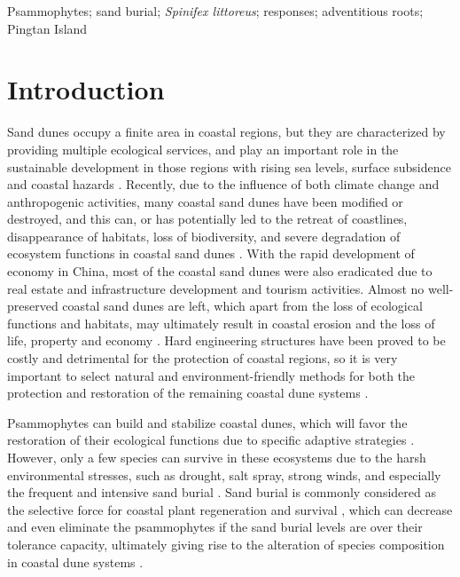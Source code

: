 \documentclass[]{interact}
\theoremstyle{plain}%
\theoremstyle{definition}
\theoremstyle{remark}
\begin{document}
\begin{keywords}
Psammophytes; sand burial; \textit{\textit{Spinifex littoreus}}; responses; adventitious roots; Pingtan Island
\end{keywords}


\section{Introduction}

\label{Introduction-1}
Sand dunes occupy a finite area in coastal regions, but they are characterized by providing multiple ecological services, and play an important role in the sustainable development in those regions with rising sea levels, surface subsidence and coastal hazards 
\citep{martinezFragilityConservationWorld2004,debattistiBelowgroundBiomassPlants2020}. 
Recently, due to the influence of both climate change and anthropogenic activities, many coastal sand dunes have been modified or destroyed, and this can, or has potentially led to the retreat of coastlines, disappearance of habitats, loss of biodiversity, and severe degradation of ecosystem functions in coastal sand dunes 
\citep{feaginCoastalErosionGlobal2005,schlacherVegetationGhostCrabs2011,quEffectsSandBurial2017}. 
With the rapid development of economy in China, most of the coastal sand dunes were also eradicated due to real estate and infrastructure development and tourism activities. Almost no well-preserved coastal sand dunes are left, which apart from the loss of ecological functions and habitats, may ultimately result in coastal erosion and the loss of life, property and economy 
\citep{yangDiurnalvariationcharacteristics2017}. 
Hard engineering structures have been proved to be costly and detrimental for the protection of coastal regions, so it is very important to select natural and environment-friendly methods for both the protection and restoration of the remaining coastal dune systems 
\citep{hanleyShiftingSandsCoastal2014}.

\label{Introduction-2}
Psammophytes can build and stabilize coastal dunes, which will favor the restoration of their ecological functions due to specific adaptive strategies 
\citep{yuanEffectsSandAccretion1993,brownMechanismsSurvivingBurial2018,debattistiBelowgroundBiomassPlants2020}. 
However, only a few species can survive in these ecosystems due to the harsh environmental stresses, such as drought, salt spray, strong winds, and especially the frequent and intensive sand burial 
\citep{maunEffectsBurialSand1986,hespEcologicalProcessesPlant1991,maunAdaptationsEnhancingSurvival1994,zhaoAdvanceDistributionAdaptability2014,duSaltSprayDistribution2020}. 
Sand burial is commonly considered as the selective force for coastal plant regeneration and survival \citep{moreno-casasolaSandMovementFactor1986, maunAdaptationsEnhancingSurvival1994}, which can decrease and even eliminate the psammophytes if the sand burial levels are over their tolerance capacity, ultimately giving rise to the alteration of species composition in coastal dune systems \citep{maunZonationVegetationLacustrine1999,millerEffectsDisturbanceVegetation2015}. 
\end{document}
